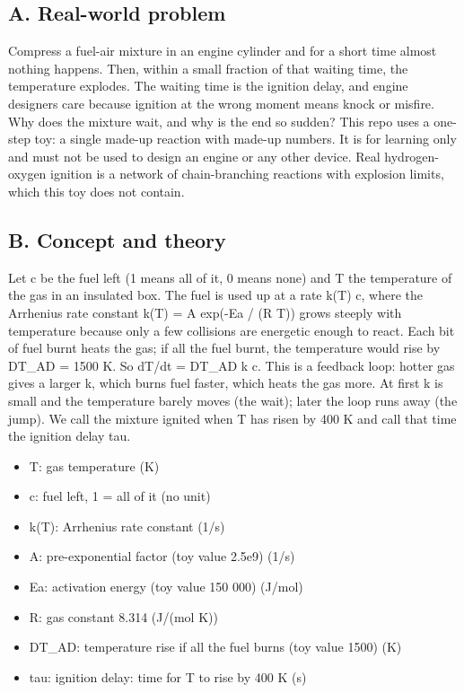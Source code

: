 \documentclass[11pt,a4paper]{article}
\begin{document}
\subsection*{A. Real-world problem}
Compress a fuel-air mixture in an engine cylinder and for a short time almost nothing happens. Then, within a small fraction of that waiting time, the temperature explodes. The waiting time is the ignition delay, and engine designers care because ignition at the wrong moment means knock or misfire. Why does the mixture wait, and why is the end so sudden? This repo uses a one-step toy: a single made-up reaction with made-up numbers. It is for learning only and must not be used to design an engine or any other device. Real hydrogen-oxygen ignition is a network of chain-branching reactions with explosion limits, which this toy does not contain.

\subsection*{B. Concept and theory}
Let c be the fuel left (1 means all of it, 0 means none) and T the temperature of the gas in an insulated box. The fuel is used up at a rate k(T) c, where the Arrhenius rate constant k(T) = A exp(-Ea / (R T)) grows steeply with temperature because only a few collisions are energetic enough to react. Each bit of fuel burnt heats the gas; if all the fuel burnt, the temperature would rise by DT\_AD = 1500 K. So dT/dt = DT\_AD k c. This is a feedback loop: hotter gas gives a larger k, which burns fuel faster, which heats the gas more. At first k is small and the temperature barely moves (the wait); later the loop runs away (the jump). We call the mixture ignited when T has risen by 400 K and call that time the ignition delay tau.

\begin{itemize}[nosep]
\item T: gas temperature (K)
\item c: fuel left, 1 = all of it (no unit)
\item k(T): Arrhenius rate constant (1/s)
\item A: pre-exponential factor (toy value 2.5e9) (1/s)
\item Ea: activation energy (toy value 150 000) (J/mol)
\item R: gas constant 8.314 (J/(mol K))
\item DT\_AD: temperature rise if all the fuel burns (toy value 1500) (K)
\item tau: ignition delay: time for T to rise by 400 K (s)
\end{itemize}
\end{document}
